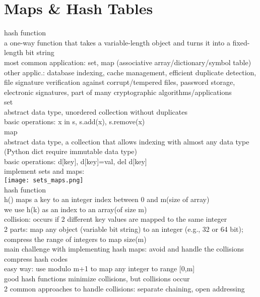 \section{Maps \& Hash Tables}
\scriptsize{hash function}\\ 
{\tiny a one-way function that takes a variable-length object and turns it into a fixed-length bit string\\
most common application: set, map (associative array/dictionary/symbol table)\\
other applic.: database indexing, cache management, efficient duplicate detection, file signature verification against corrupt/tempered files, password storage, electronic signatures, part of many cryptographic algorithms/applications
}\\
\scriptsize{set}\\ {\tiny abstract data type, unordered collection without duplicates\\
basic operations: x in s, s.add(x), s.remove(x)
}\\
\scriptsize{map}\\ {\tiny abstract data type, a collection that allows indexing with almost any data type (Python dict require immutable data type)\\
basic operations: d[key], d[key]=val, del d[key]
}\\
{\tiny implement sets and maps:\\}
\texttt{[image: sets\_maps.png]}\\
\scriptsize{hash function}\\
{\tiny h() maps a key to an integer index between 0 and m(size of array)\\
we use h(k) as an index to an array(of size m)\\
collision: occurs if 2 different key values are mapped to the same integer\\
2 parts: map any object (variable bit string) to an integer (e.g., 32 or 64 bit); compress the range of integers to map size(m)\\
main challenge with implementing hash maps: avoid and handle the collisions
}\\
\scriptsize{compress hash codes}\\ 
{\tiny easy way: use modulo m+1 to map any integer to range [0,m]\\
good hash functions minimize collisions, but collisions occur\\
2 common approaches to handle collisions: separate chaining, open addressing
}\\
